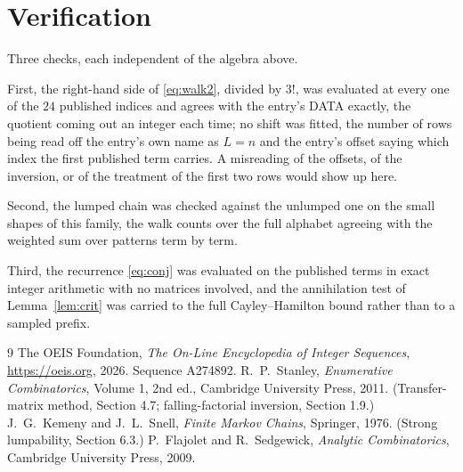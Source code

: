\documentclass[11pt,a4paper]{article}
\theoremstyle{plain}
\theoremstyle{definition}
\begin{document}
\section{Verification}

Three checks, each independent of the algebra above.

First, the right-hand side of \eqref{eq:walk2}, divided by $3!$, was evaluated at every
one of the $24$ published indices and agrees with the entry's DATA exactly, the quotient
coming out an integer each time; no shift was fitted, the number of rows being read off the
entry's own name as $L=n$ and the entry's offset saying which index the first published
term carries. A misreading of the offsets, of the inversion, or of the treatment of the first
two rows would show up here.

Second, the lumped chain was checked against the unlumped one on the small shapes of this
family, the walk counts over the full alphabet agreeing with the weighted sum over patterns
term by term.

Third, the recurrence \eqref{eq:conj} was evaluated on the published terms in exact integer
arithmetic with no matrices involved, and the annihilation test of Lemma~\ref{lem:crit} was
carried to the full Cayley--Hamilton bound rather than to a sampled prefix.

\begin{thebibliography}{9}
 The OEIS Foundation, \emph{The On-Line Encyclopedia of Integer
Sequences}, \url{https://oeis.org}, 2026. Sequence A274892.
 R.~P.~Stanley, \emph{Enumerative Combinatorics}, Volume 1, 2nd ed.,
Cambridge University Press, 2011. (Transfer-matrix method, Section 4.7; falling-factorial
inversion, Section 1.9.)
 J.~G.~Kemeny and J.~L.~Snell, \emph{Finite Markov Chains}, Springer,
1976. (Strong lumpability, Section 6.3.)
 P.~Flajolet and R.~Sedgewick, \emph{Analytic Combinatorics}, Cambridge
University Press, 2009.
\end{thebibliography}
\end{document}
